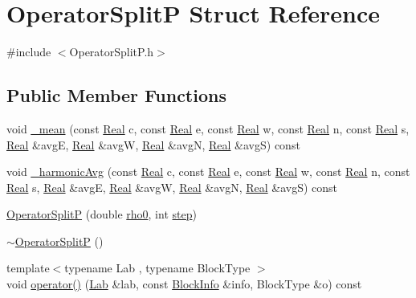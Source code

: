\hypertarget{struct_operator_split_p}{}\section{Operator\+Split\+P Struct Reference}
\label{struct_operator_split_p}


{\ttfamily \#include $<$Operator\+Split\+P.\+h$>$}

\subsection*{Public Member Functions}
\begin{DoxyCompactItemize}
\item 
void \hyperlink{struct_operator_split_p_a1ced535ca476fa423f43714a911f4831}{\+\_\+mean} (const \hyperlink{_h_d_f5_dumper_8h_a445a5f0e2a34c9d97d69a3c2d1957907}{Real} c, const \hyperlink{_h_d_f5_dumper_8h_a445a5f0e2a34c9d97d69a3c2d1957907}{Real} e, const \hyperlink{_h_d_f5_dumper_8h_a445a5f0e2a34c9d97d69a3c2d1957907}{Real} w, const \hyperlink{_h_d_f5_dumper_8h_a445a5f0e2a34c9d97d69a3c2d1957907}{Real} n, const \hyperlink{_h_d_f5_dumper_8h_a445a5f0e2a34c9d97d69a3c2d1957907}{Real} s, \hyperlink{_h_d_f5_dumper_8h_a445a5f0e2a34c9d97d69a3c2d1957907}{Real} \&avg\+E, \hyperlink{_h_d_f5_dumper_8h_a445a5f0e2a34c9d97d69a3c2d1957907}{Real} \&avg\+W, \hyperlink{_h_d_f5_dumper_8h_a445a5f0e2a34c9d97d69a3c2d1957907}{Real} \&avg\+N, \hyperlink{_h_d_f5_dumper_8h_a445a5f0e2a34c9d97d69a3c2d1957907}{Real} \&avg\+S) const 
\item 
void \hyperlink{struct_operator_split_p_a29fdbb5374bf0f021fe91c63ca9b7f24}{\+\_\+harmonic\+Avg} (const \hyperlink{_h_d_f5_dumper_8h_a445a5f0e2a34c9d97d69a3c2d1957907}{Real} c, const \hyperlink{_h_d_f5_dumper_8h_a445a5f0e2a34c9d97d69a3c2d1957907}{Real} e, const \hyperlink{_h_d_f5_dumper_8h_a445a5f0e2a34c9d97d69a3c2d1957907}{Real} w, const \hyperlink{_h_d_f5_dumper_8h_a445a5f0e2a34c9d97d69a3c2d1957907}{Real} n, const \hyperlink{_h_d_f5_dumper_8h_a445a5f0e2a34c9d97d69a3c2d1957907}{Real} s, \hyperlink{_h_d_f5_dumper_8h_a445a5f0e2a34c9d97d69a3c2d1957907}{Real} \&avg\+E, \hyperlink{_h_d_f5_dumper_8h_a445a5f0e2a34c9d97d69a3c2d1957907}{Real} \&avg\+W, \hyperlink{_h_d_f5_dumper_8h_a445a5f0e2a34c9d97d69a3c2d1957907}{Real} \&avg\+N, \hyperlink{_h_d_f5_dumper_8h_a445a5f0e2a34c9d97d69a3c2d1957907}{Real} \&avg\+S) const 
\item 
\hyperlink{struct_operator_split_p_a6e98b9ffa8fc8b723d165bd8875f4e71}{Operator\+Split\+P} (double \hyperlink{struct_operator_split_p_a3ac24a890985abf7a9aacbd5dd6eb793}{rho0}, int \hyperlink{struct_operator_split_p_a0ecf20a65e1c44eb54de490c9db4e177}{step})
\item 
\hyperlink{struct_operator_split_p_a88289827938a12556d02544d6f2ee1f5}{$\sim$\+Operator\+Split\+P} ()
\item 
{\footnotesize template$<$typename Lab , typename Block\+Type $>$ }\\void \hyperlink{struct_operator_split_p_abd37608f5d445bfaf06c9b1f2a31fabf}{operator()} (\hyperlink{_definitions_8h_ad6f951af9a2a6ebc1975404882b34314}{Lab} \&lab, const \hyperlink{struct_block_info}{Block\+Info} \&info, Block\+Type \&o) const 
\end{DoxyCompactItemize}
